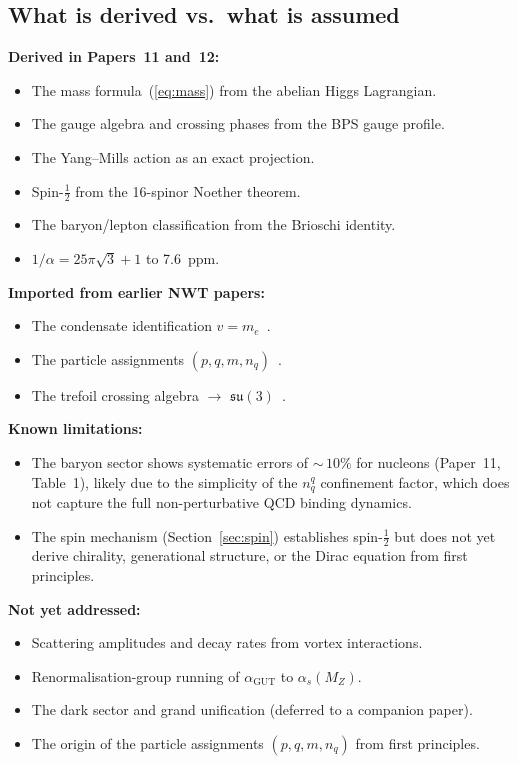 \documentclass[11pt]{article}
\newcommand{\su}{\mathfrak{su}}
\newcommand{\half}{\tfrac{1}{2}}
\begin{document}
\subsection{What is derived vs.\ what is assumed}

\noindent\textbf{Derived in Papers~11 and~12:}
\begin{itemize}
\item The mass formula~(\ref{eq:mass}) from the abelian Higgs
      Lagrangian.
\item The gauge algebra and crossing phases from the BPS gauge
      profile.
\item The Yang--Mills action as an exact projection.
\item Spin-$\half$ from the 16-spinor Noether theorem.
\item The baryon/lepton classification from the Brioschi identity.
\item $1/\alpha = 25\pi\sqrt{3} + 1$ to 7.6~ppm.
\end{itemize}

\noindent\textbf{Imported from earlier NWT papers:}
\begin{itemize}
\item The condensate identification $v = m_e$~\cite{NWT5}.
\item The particle assignments $(p,q,m,n_q)$~\cite{NWT1,NWT6}.
\item The trefoil crossing algebra $\to$
      $\su(3)$~\cite{NWT8}.
\end{itemize}

\noindent\textbf{Known limitations:}
\begin{itemize}
\item The baryon sector shows systematic errors of ${\sim}\,10\%$ for
      nucleons (Paper~11, Table~1), likely due to the simplicity of
      the $n_q^q$ confinement factor, which does not capture the full
      non-perturbative QCD binding dynamics.
\item The spin mechanism (Section~\ref{sec:spin}) establishes
      spin-$\half$ but does not yet derive chirality, generational
      structure, or the Dirac equation from first principles.
\end{itemize}

\noindent\textbf{Not yet addressed:}
\begin{itemize}
\item Scattering amplitudes and decay rates from vortex interactions.
\item Renormalisation-group running of $\alpha_\text{GUT}$ to
      $\alpha_s(M_Z)$.
\item The dark sector and grand unification (deferred to a companion
      paper).
\item The origin of the particle assignments $(p,q,m,n_q)$ from
      first principles.
\end{itemize}
\end{document}
